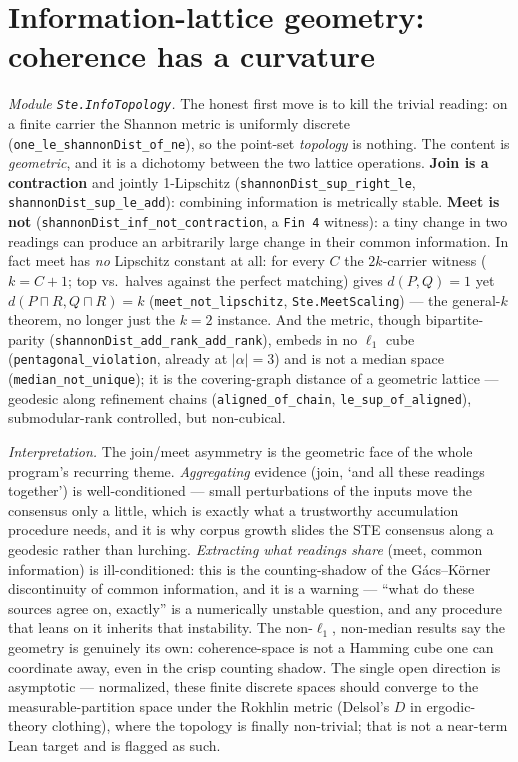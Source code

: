 \documentclass[11pt]{article}
\newcommand{\code}[1]{\texttt{#1}}
\begin{document}
\section{Information-lattice geometry: coherence has a curvature}
\emph{Module \code{Ste.InfoTopology}.}
The honest first move is to kill the trivial reading: on a finite carrier
the Shannon metric is uniformly discrete (\code{one\_le\_shannonDist\_of\_ne}),
so the point-set \emph{topology} is nothing.  The content is
\emph{geometric}, and it is a dichotomy between the two lattice
operations.  \textbf{Join is a contraction} and jointly 1-Lipschitz
(\code{shannonDist\_sup\_right\_le}, \code{shannonDist\_sup\_le\_add}):
combining information is metrically stable.  \textbf{Meet is not}
(\code{shannonDist\_inf\_not\_contraction}, a \code{Fin 4} witness): a
tiny change in two readings can produce an arbitrarily large change in
their common information.  In fact meet has \emph{no} Lipschitz constant
at all: for every $C$ the $2k$-carrier witness ($k=C+1$; top vs.\ halves
against the perfect matching) gives $d(P,Q)=1$ yet
$d(P\sqcap R,Q\sqcap R)=k$ (\code{meet\_not\_lipschitz},
\code{Ste.MeetScaling}) --- the general-$k$ theorem, no longer just the
$k=2$ instance.  And the metric, though bipartite-parity
(\code{shannonDist\_add\_rank\_add\_rank}), embeds in no $\ell_1$ cube
(\code{pentagonal\_violation}, already at $|\alpha|=3$) and is not a
median space (\code{median\_not\_unique}); it is the covering-graph
distance of a geometric lattice --- geodesic along refinement chains
(\code{aligned\_of\_chain}, \code{le\_sup\_of\_aligned}), submodular-rank
controlled, but non-cubical.

\emph{Interpretation.} The join/meet asymmetry is the geometric face of
the whole program's recurring theme.  \emph{Aggregating} evidence
(join, `and all these readings together') is well-conditioned --- small
perturbations of the inputs move the consensus only a little, which is
exactly what a trustworthy accumulation procedure needs, and it is why
corpus growth slides the STE consensus along a geodesic rather than
lurching.  \emph{Extracting what readings share} (meet, common
information) is ill-conditioned: this is the counting-shadow of the
Gács--Körner discontinuity of common information, and it is a warning ---
``what do these sources agree on, exactly'' is a numerically unstable
question, and any procedure that leans on it inherits that instability.
The non-$\ell_1$, non-median results say the geometry is genuinely its
own: coherence-space is not a Hamming cube one can coordinate away, even
in the crisp counting shadow.  The single open direction is asymptotic
--- normalized, these finite discrete spaces should converge to the
measurable-partition space under the Rokhlin metric (Delsol's $D$ in
ergodic-theory clothing), where the topology is finally non-trivial; that
is not a near-term Lean target and is flagged as such.
\end{document}
